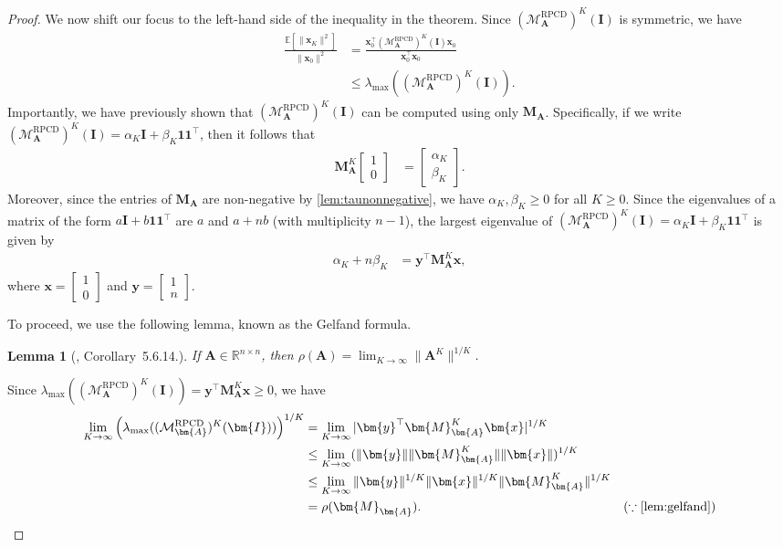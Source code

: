 \documentclass{article}
\theoremstyle{plain}
\newtheorem{lemma}[theorem]{Lemma}
\theoremstyle{definition}
\theoremstyle{remark}
\def\bigopen#1{\left(#1\right)}
\def\bigclosed#1{\left[#1\right]}
\newcommand{\RPCD}{\text{RPCD}} %
\newcommand{\MARPCD}{\mathcal{M}_{\bm{A}}^{\RPCD}} %
\def\vone{{\bm{1}}}
\def\vx{{\bm{x}}}
\def\vy{{\bm{y}}}
\def\mA{{\bm{A}}}
\def\mI{{\bm{I}}}
\def\mM{{\bm{M}}}
\newcommand{\E}{\mathbb{E}}
\newcommand{\R}{\mathbb{R}}
\begin{document}
\begin{proof}
We now shift our focus to the left-hand side of the inequality in the theorem. Since $(\MARPCD)^K(\mI)$ is symmetric, we have 
\begin{align*}
    \frac{\E \bigclosed{\|\vx_K\|^2}}{\|\vx_0\|^2} &= \frac{\vx_0^{\top} (\MARPCD)^K(\mI) \vx_0}{\vx_0^{\top} \vx_0} \\
    &\le \lambda_{\max} ((\MARPCD)^K(\mI)).
\end{align*}
Importantly, we have previously shown that $(\MARPCD)^K(\mI)$ can be computed using only $\mM_{\mA}$. Specifically, if we write $(\MARPCD)^K(\mI) = \alpha_K \mI + \beta_K \vone \vone^{\top}$, then it follows that 
\begin{align*}
    \mM_{\mA}^K 
    \begin{bmatrix}
        1\\
        0
    \end{bmatrix} &= \begin{bmatrix}
        \alpha_K\\
        \beta_K
    \end{bmatrix}.
\end{align*}
Moreover, since the entries of $\mM_{\mA}$ are non-negative by \cref{lem:taunonnegative}, we have $\alpha_K, \beta_K \ge 0$ for all $K\ge 0$. Since the eigenvalues of a matrix of the form $a\mI + b\vone \vone^{\top}$ are $a$ and $a+nb$ (with multiplicity $n-1$), the largest eigenvalue of $(\MARPCD)^K(\mI) = \alpha_K \mI + \beta_K \vone \vone^{\top}$ is given by 
\begin{align*}
    \alpha_K + n\beta_K &= \vy^{\top} \mM_{\mA}^K \vx,
\end{align*}
where $\vx = 
\begin{bmatrix}
    1 \\ 0
\end{bmatrix}$ and $\vy = 
\begin{bmatrix}
    1 \\ n
\end{bmatrix}$.

To proceed, we use the following lemma, known as the Gelfand formula.
\begin{lemma}[\citet{horn2012}, Corollary~5.6.14.]
    \label{lem:gelfand}
    If $\mA\in \R^{n \times n}$, then $\rho(\mA) = \lim_{K \to \infty} \|\mA^K\|^{1/K}$.
\end{lemma}

Since $\lambda_{\max} ((\MARPCD)^K(\mI)) = \vy^{\top} \mM_{\mA}^K \vx \ge 0$, we have 
\begin{align*}
    \lim_{K \to \infty} \bigopen{\lambda_{\max} ((\MARPCD)^K(\mI))}^{1/K} &= \lim_{K \to \infty} |\vy^{\top} \mM_{\mA}^K \vx|^{1/K} \\
    &\le \lim_{K \to \infty} (\|\vy\| \|\mM_{\mA}^K\| \|\vx\|)^{1/K} \\
    &\le \lim_{K \to \infty} \|\vy\|^{1/K} \|\vx\|^{1/K} \|\mM_{\mA}^K\|^{1/K} \\
    &= \rho(\mM_{\mA}). & (\because \text{\cref{lem:gelfand}})
\end{align*}


\end{proof}
\end{document}
